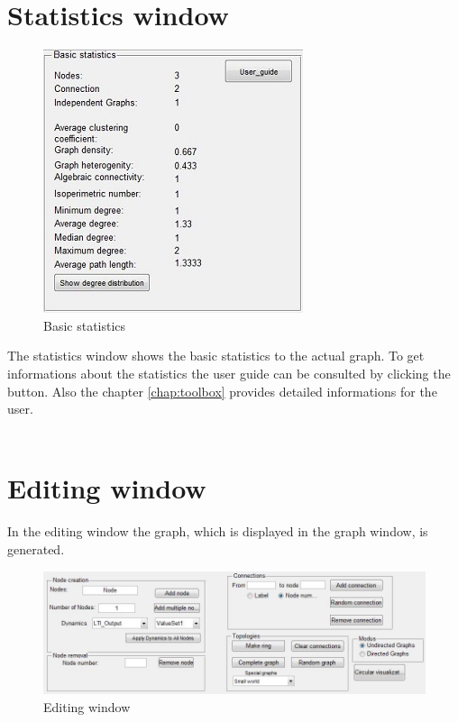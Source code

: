 \documentclass[12pt]{report}
\begin{document}
\section{Statistics window}
\begin{figure}[h]
\centering
\includegraphics[scale=.8]{statswin}
\caption{Basic statistics}
\label{FIG:abb30}
\end{figure}
\noindent The statistics window shows the basic statistics to the actual graph. To get informations about the statistics the user guide can be consulted by clicking the button. Also the chapter \ref{chap:toolbox} provides detailed informations for the user.\\
\\
\section{Editing window}
\label{sec:editwin}
In the editing window the graph, which is displayed in the graph window, is generated.\\
\begin{figure}[h]
\centering
\includegraphics[scale=.6]{editingwindowa}
\caption{Editing window}
\label{FIG:abb31}
\end{figure}
\\
\end{document}
